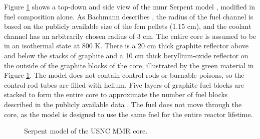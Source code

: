 Figure \ref{fig:mmr_core} shows a top-down and side view of the \gls{mmr} Serpent model \cite{bachmann_mmr_like_2023}, modified in fuel composition alone. As Bachmann describes \cite{bachmann_thesis_2023}, the radius of the fuel channel is based on the publicly available size of the \gls{fcm} pellets (1.15 cm), and the coolant channel has an arbitrarily chosen radius of 3 cm. The entire core is assumed to be in an isothermal state at 800 K. There is a 20 cm thick graphite reflector above and below the stacks of graphite and a 10 cm thick beryllium-oxide reflector on the outside of the graphite blocks of the core, illustrated by the green material in Figure \ref{fig:mmr_core}. The model does not contain control rods or burnable poisons, so the control rod tubes are filled with helium. Five layers of graphite fuel blocks are stacked to form the entire core to approximate the number of fuel blocks described in the publicly available data \cite{usnc_design_2021}. The fuel does not move through the core, as the model is designed to use the same fuel for the entire reactor lifetime.


\begin{figure}[H]
    \hfill
    \caption{Serpent model of the USNC MMR core.}
    \label{fig:mmr_core}
\end{figure}



